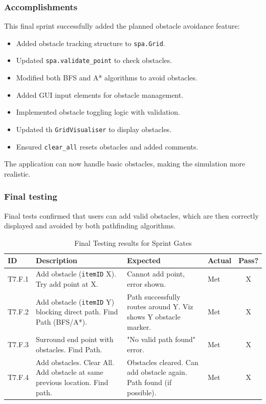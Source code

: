 \subsubsection{Accomplishments}
This final sprint successfully added the planned obstacle avoidance feature:
\begin{itemize}
    \item Added obstacle tracking structure to \verb|spa.Grid|.
    \item Updated \verb|spa.validate_point| to check obstacles.
	\item Modified both BFS and A* algorithms to avoid obstacles.
	\item Added GUI input elements for obstacle management.
	\item Implemented obstacle toggling logic with validation.
	\item Updated th \verb|GridVisualiser| to display obstacles.
	\item Ensured \verb|clear_all| resets obstacles and added comments.
\end{itemize}
The application can now handle basic obstacles, making the simulation more realistic.

\subsubsection{Final testing}
Final tests confirmed that users can add valid obstacles, which are then correctly displayed and avoided by both pathfinding algorithms.


\begin{table}[htbp] %
	\centering
	\begin{tabularx}{\textwidth}{|l|X|p{4.5cm}|p{1.5cm}|c|}
		\hline
		\textbf{ID} & \textbf{Description} & \textbf{Expected} & \textbf{Actual} & \textbf{Pass?} \\
		\hline
		T7.F.1 & Add obstacle (\verb|itemID| X). Try add point at X. & Cannot add point, error shown. & Met & X \\
		\hline
		T7.F.2 & Add obstacle (\verb|itemID| Y) blocking direct path. Find Path (BFS/A*). & Path successfully routes around Y. Viz shows Y obstacle marker. & Met & X \\
		\hline
		T7.F.3 & Surround end point with obstacles. Find Path. & "No valid path found" error. & Met & X \\
		\hline
		T7.F.4 & Add obstacles. Clear All. Add obstacle at same previous location. Find path. & Obstacles cleared. Can add obstacle again. Path found (if possible). & Met & X \\
		\hline
	\end{tabularx}
	\caption{Final Testing results for Sprint Gates}
\end{table}


